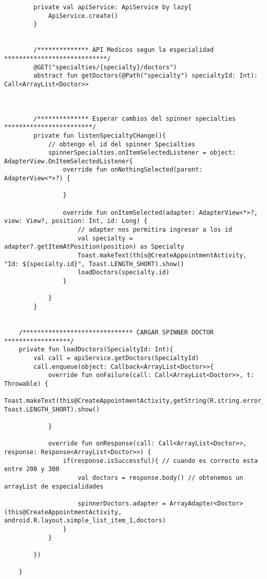 \documentclass[a4paper]{article}
\begin{document}
	\lstset{style=mystyle,caption=Spinner de medicos,label=DescriptiveLabel}
	\begin{lstlisting}
		private val apiService: ApiService by lazy{
			ApiService.create()
		}
		
		
		/************** API Medicos segun la especialidad ****************************/
		@GET("specialties/{specialty}/doctors")
		abstract fun getDoctors(@Path("specialty") specialtyId: Int): Call<ArrayList<Doctor>>
		
		
		
		/************** Esperar cambios del spinner specialties ************************/
		private fun listenSpecialtyCHange(){
			// obtengo el id del spinner Specialties
			spinnerSpecialties.onItemSelectedListener = object: AdapterView.OnItemSelectedListener{
				override fun onNothingSelected(parent: AdapterView<*>?) {
					
				}
				
				override fun onItemSelected(adapter: AdapterView<*>?, view: View?, position: Int, id: Long) {
					// adapter nos permitira ingresar a los id
					val specialty = adapter?.getItemAtPosition(position) as Specialty
					Toast.makeText(this@CreateAppointmentActivity, "Id: ${specialty.id}", Toast.LENGTH_SHORT).show()
					loadDoctors(specialty.id)
				}
				
			}
		}
	
	
	/****************************** CARGAR SPINNER DOCTOR ******************/
	private fun loadDoctors(SpecialtyId: Int){
		val call = apiService.getDoctors(SpecialtyId)
		call.enqueue(object: Callback<ArrayList<Doctor>>{
			override fun onFailure(call: Call<ArrayList<Doctor>>, t: Throwable) {
				Toast.makeText(this@CreateAppointmentActivity,getString(R.string.error_loading_doctors), Toast.LENGTH_SHORT).show()
				
			}
			
			override fun onResponse(call: Call<ArrayList<Doctor>>, response: Response<ArrayList<Doctor>>) {
				if(response.isSuccessful){ // cuando es correcto esta entre 200 y 300
					val doctors = response.body() // obtenemos un arrayList de especialidades
					
					spinnerDoctors.adapter = ArrayAdapter<Doctor>(this@CreateAppointmentActivity, android.R.layout.simple_list_item_1,doctors)
				}
			}
			
		})
		
	}
		
	\end{lstlisting}
	
\end{document}
